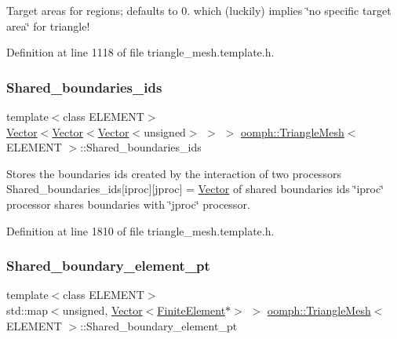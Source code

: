 Target areas for regions; defaults to 0. which (luckily) implies \char`\"{}no specific target area\char`\"{} for triangle! 



Definition at line 1118 of file triangle\+\_\+mesh.\+template.\+h.

\mbox{\label{classoomph_1_1TriangleMesh_a0a9ca3fff7a20de44410bb246becf0dc}} 
\subsubsection{\texorpdfstring{Shared\+\_\+boundaries\+\_\+ids}{Shared\_boundaries\_ids}}
{\footnotesize\ttfamily template$<$class E\+L\+E\+M\+E\+NT$>$ \\
\hyperlink{classoomph_1_1Vector}{Vector}$<$\hyperlink{classoomph_1_1Vector}{Vector}$<$\hyperlink{classoomph_1_1Vector}{Vector}$<$unsigned$>$ $>$ $>$ \hyperlink{classoomph_1_1TriangleMesh}{oomph\+::\+Triangle\+Mesh}$<$ E\+L\+E\+M\+E\+NT $>$\+::Shared\+\_\+boundaries\+\_\+ids\hspace{0.3cm}{\ttfamily [protected]}}



Stores the boundaries ids created by the interaction of two processors Shared\+\_\+boundaries\+\_\+ids\mbox{[}iproc\mbox{]}\mbox{[}jproc\mbox{]} = \hyperlink{classoomph_1_1Vector}{Vector} of shared boundaries ids \char`\"{}iproc\char`\"{} processor shares boundaries with \char`\"{}jproc\char`\"{} processor. 



Definition at line 1810 of file triangle\+\_\+mesh.\+template.\+h.

\mbox{\label{classoomph_1_1TriangleMesh_afa3e46babf3984371ce4da85b110b6fa}} 
\subsubsection{\texorpdfstring{Shared\+\_\+boundary\+\_\+element\+\_\+pt}{Shared\_boundary\_element\_pt}}
{\footnotesize\ttfamily template$<$class E\+L\+E\+M\+E\+NT$>$ \\
std\+::map$<$unsigned, \hyperlink{classoomph_1_1Vector}{Vector}$<$\hyperlink{classoomph_1_1FiniteElement}{Finite\+Element}$\ast$$>$ $>$ \hyperlink{classoomph_1_1TriangleMesh}{oomph\+::\+Triangle\+Mesh}$<$ E\+L\+E\+M\+E\+NT $>$\+::Shared\+\_\+boundary\+\_\+element\+\_\+pt\hspace{0.3cm}{\ttfamily [protected]}}



